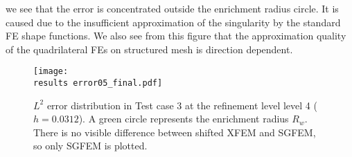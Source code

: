 we see that the error is concentrated outside the enrichment radius circle. It is caused due to the insufficient approximation of the singularity
by the standard FE shape functions. We also see from this figure that the approximation quality of the quadrilateral FEs on structured mesh is direction dependent.
%
\begin{figure}[!htb]
  \centering    
  \texttt{[image: \\results error05\_final.pdf]}
  \caption[Error distribution in Test case 3]{$L^2$ error distribution in Test case 3 at the refinement level level 4 ($h=0.0312$).
  A green circle represents the enrichment radius $R_w$. There is no visible difference between shifted XFEM and SGFEM, so only SGFEM is plotted.}
  \label{fig:error_distribution_test3}
\end{figure}
%

